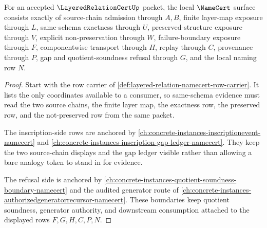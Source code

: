 \begin{theorem}
\label{thm:layered-relation-namecert-row-obligations}
For an accepted $\LayeredRelationCertUp$ packet, the local $\NameCert$ surface consists exactly of source-chain admission through $A,B$, finite layer-map exposure through $L$, same-schema exactness through $U$, preserved-structure exposure through $V$, explicit non-preservation through $W$, failure-boundary exposure through $F$, componentwise transport through $H$, replay through $C$, provenance through $P$, gap and quotient-soundness refusal through $G$, and the local naming row $N$.
\end{theorem}
\begin{proof}
Start with the row carrier of \autoref{def:layered-relation-namecert-row-carrier}. It lists the only coordinates available to a consumer, so same-schema evidence must read the two source chains, the finite layer map, the exactness row, the preserved row, and the not-preserved row from the same packet.

The inscription-side rows are anchored by \autoref{ch:concrete-instances-inscriptionevent-namecert} and \autoref{ch:concrete-instances-inscription-gap-ledger-namecert}. They keep the two source-chain displays and the gap ledger visible rather than allowing a bare analogy token to stand in for evidence.

The refusal side is anchored by \autoref{ch:concrete-instances-quotient-soundness-boundary-namecert} and the audited generator route of \autoref{ch:concrete-instances-authorizedgeneratorrecursor-namecert}. These boundaries keep quotient soundness, generator authority, and downstream consumption attached to the displayed rows $F,G,H,C,P,N$.
\end{proof}

